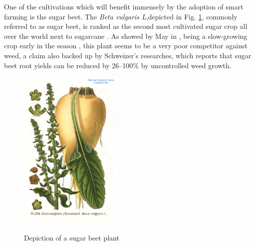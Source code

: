 One of the cultivations which will benefit immensely by the adoption of smart farming is the sugar beet. The \textit{Beta vulgaris L},depicted in Fig. \ref{fig:sugar_beet}, commonly referred to as sugar beet, is ranked as the second most cultivated  sugar crop all over the world next to sugarcane \cite{bhadra_weed_2020}. As showed by May in \cite{may_economic_2003}, being a slow-growing crop early in the season \cite{bhadra_weed_2020}, this plant seems to be a very poor competitor against weed, a claim also backed up by Schweizer's researches, which reports that sugar beet root yields can be reduced by 26–100\% by uncontrolled weed growth.  \cite{schweizer_weed_1989}\\
\begin{figure}[ht]
	\centering
	\includegraphics[width = 5cm]{img/276_Beta_vulgaris_L.jpg}
	\caption[Depiction of a sugar beet plant]{Depiction of a sugar beet plant \cite{masclef_sugar_1891} }{\centering}
	\label{fig:sugar_beet}
\end{figure}
